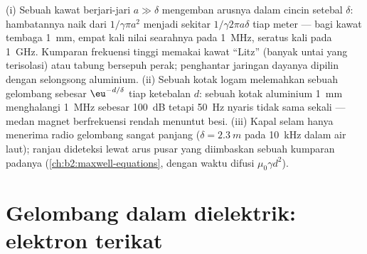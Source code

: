 \begin{example}\label{ex:b2:waves-in-media:skinuses}
(i) Sebuah kawat berjari-jari $a \gg \delta$ mengemban arusnya dalam cincin
setebal $\delta$: hambatannya naik dari $1/\gamma\pi a^2$ menjadi sekitar $1/\gamma
2\pi a\delta$ tiap meter --- bagi kawat tembaga \qty{1}{mm}, empat kali nilai
searahnya pada \qty{1}{MHz}, seratus kali pada \qty{1}{GHz}. Kumparan frekuensi tinggi
memakai kawat ``Litz'' (banyak untai yang terisolasi) atau tabung bersepuh perak;
penghantar jaringan dayanya dipilin dengan selongsong aluminium. (ii) Sebuah
kotak logam melemahkan sebuah gelombang sebesar $\eu^{-d/\delta}$ tiap ketebalan $d$: sebuah
kotak aluminium \qty{1}{mm} menghalangi \qty{1}{MHz} sebesar \qty{100}{dB} tetapi \qty{50}{Hz}
nyaris tidak sama sekali --- medan magnet berfrekuensi rendah menuntut besi. (iii)
Kapal selam hanya menerima radio gelombang sangat panjang ($\delta = \qty{2.3}{m}$ pada
\qty{10}{kHz} dalam air laut); ranjau dideteksi lewat arus pusar yang diimbaskan
sebuah kumparan padanya (\cref{ch:b2:maxwell-equations}, dengan waktu difusi
$\mu_0\gamma d^2$).
\end{example}

\section{Gelombang dalam dielektrik: elektron terikat}

